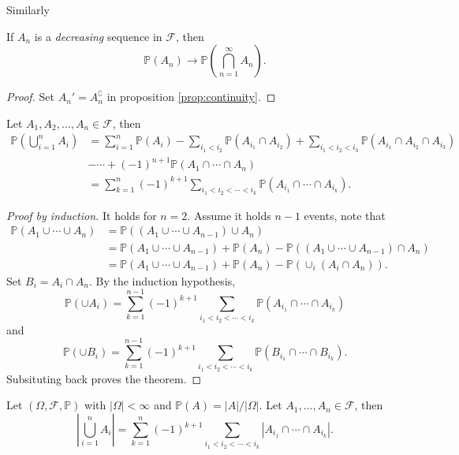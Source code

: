 Similarly 
\begin{corollary}\label{col:continuity2}
    If $ A_n $ is a \textit{decreasing} sequence in $ \mathcal{F} $, then 
    \[
        \mathbb{P}(A_n)\to \mathbb{P}\left( \bigcap_{n=1}^{\infty}A_n \right).
    \]
\end{corollary}
\begin{proof}
    Set $ A_n' = A_n^{\complement} $ in proposition \ref{prop:continuity}.
\end{proof}

\begin{proposition}\label{prop:Inclusion-exclusion formula}
    Let $ A_1,A_2, \dots, A_n\in \mathcal{F} $, then 
    \begin{align*}
        \mathbb{P}\left( \bigcup_{i=1}^{n}A_i \right) &= \sum_{i=1}^{n}\mathbb{P}(A_i) - \sum_{i_1<i_2} \mathbb{P}(A_{i_1}\cap A_{i_2})+\sum_{i_1<i_2<i_3}\mathbb{P}(A_{i_1}\cap A_{i_2}\cap A_{i_3})\\ 
        &-\cdots+ (-1)^{n+1} \mathbb{P}(A_1 \cap \cdots \cap A_n)\\ 
        &=\sum_{k=1}^{n}(-1)^{k+1} \sum_{i_1<i_2<\cdots<i_k}\mathbb{P}\left( A_{i_1}\cap \cdots \cap A_{i_k} \right).
    \end{align*}
\end{proposition}
\begin{proof}[Proof by induction]
    It holds for $n=2$. Assume it holds $n-1$ events, note that 
    \begin{align*}
        \mathbb{P}(A_1 \cup \cdots \cup A_n)&= \mathbb{P}\left( (A_1 \cup \cdots \cup A_{n-1}) \cup A_n \right)\\ 
        &= \mathbb{P}(A_1 \cup \cdots \cup A_{n-1})+\mathbb{P}(A_n)-\mathbb{P}((A_1 \cup \cdots \cup A_{n-1})\cap A_n)\\ 
        &= \mathbb{P}(A_1 \cup \cdots \cup A_{n-1})+\mathbb{P}(A_n)-\mathbb{P}(\cup_i (A_i\cap A_n)).
    \end{align*}
    Set $ B_i=A_i\cap A_n $. By the induction hypothesis,
    \[
        \mathbb{P}(\cup A_i)=\sum_{k=1}^{n-1}(-1)^{k+1} \sum_{i_1<i_2<\cdots<i_k}\mathbb{P}\left( A_{i_1}\cap \cdots \cap A_{i_k} \right)
    \]
    and 
    \[
        \mathbb{P}(\cup B_i)=\sum_{k=1}^{n-1}(-1)^{k+1} \sum_{i_1<i_2<\cdots<i_k}\mathbb{P}\left( B_{i_1}\cap \cdots \cap B_{i_k} \right).
    \]
    Subsituting back proves the theorem.
\end{proof}
\begin{corollary}\label{col:inclusion-exclusion2}
        Let $ (\Omega,\mathcal{F},\mathbb{P}) $ with $ |\Omega|<\infty  $ and $ \mathbb{P}(A)=|A|/|\Omega| $. Let $ A_1,\dots,A_n\in \mathcal{F} $, then 
        \[
            \left| \bigcup_{i=1}^{n}A_i \right| = \sum_{k=1}^{n}(-1)^{k+1} \sum_{i_1<i_2<\cdots<i_k}\left| A_{i_1}\cap \cdots \cap A_{i_k} \right|.
        \]
\end{corollary}

